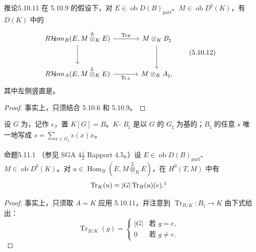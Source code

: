 \begin{SGAresult}{推论}{5.10.11}
在 5.10.9 的假设下，对 $E\in\operatorname{ob}D(B)_{\mathrm{parf}}$、$M\in\operatorname{ob}D^b(K)$，有 $D(K)$ 中的
\begin{equation}\begin{tikzcd}[column sep=large,row sep=large]
R\mathcal{H}\!om_B(E,M\overset L\otimes_K E)\arrow[r,"\operatorname{Tr}_B"]\arrow[d] & M\otimes_K B_\natural\arrow[d]\\
R\mathcal{H}\!om_A(E,M\overset L\otimes_K E)\arrow[r,"\operatorname{Tr}_A"'] & M\otimes_K A_\natural,
\end{tikzcd}\tag{5.10.12}\end{equation}
其中左侧竖直是。
\end{SGAresult}
\begin{proof}事实上，只须结合 5.10.6 和 5.10.9。\end{proof}

设 $G$ 为，记作 $e$，置 $K[G]=B$。$K$- $B_\natural$ 是以 $G$ 的 $G_\natural$ 为基的；$B_\natural$ 的任意 $s$ 唯一地写成 $s=\sum_{x\in G_\natural}s(x)x$。

\begin{SGAresult}{命题}{5.11.1}
（参见 SGA $4\frac12$ Rapport 4.5。）设 $E\in\operatorname{ob}D(B)_{\mathrm{parf}}$、$M\in\operatorname{ob}D^b(K)$。对 $u\in\operatorname{Hom}_B(E,M\overset L\otimes_K E)$，在 $H^0(T,M)$ 中有
\[\operatorname{Tr}_K(u)=|G|\operatorname{Tr}_B(u)(e).\footnotemark\]
\end{SGAresult}
\begin{proof}
事实上，只须取 $A=K$ 应用 5.10.11，并注意到 $\operatorname{Tr}_{B/K}:B_\natural\to K$ 由下式给出：
\begin{equation}\operatorname{Tr}_{B/K}(g)=\begin{cases}|G|&\text{若 }g=e,\\0&\text{若 }g\ne e.\end{cases}\tag{5.11.2}\end{equation}
\end{proof}

